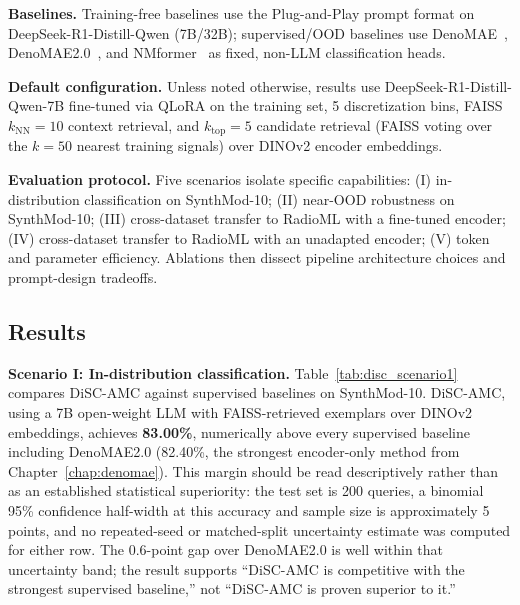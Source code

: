 \textbf{Baselines.} Training-free baselines use the Plug-and-Play prompt format on DeepSeek-R1-Distill-Qwen (7B/32B); supervised/OOD baselines use DenoMAE~\cite{faysal2025denomae}, DenoMAE2.0~\cite{faysal2025denomae20improvingdenoisingmasked}, and NMformer~\cite{faysal2024nmformer} as fixed, non-LLM classification heads.

\textbf{Default configuration.} Unless noted otherwise, results use DeepSeek-R1-Distill-Qwen-7B fine-tuned via QLoRA on the training set, 5 discretization bins, FAISS $k_{\mathrm{NN}}=10$ context retrieval, and $k_{\mathrm{top}}=5$ candidate retrieval (FAISS voting over the $k=50$ nearest training signals) over DINOv2 encoder embeddings.

\textbf{Evaluation protocol.} Five scenarios isolate specific capabilities: (I) in-distribution classification on SynthMod-10; (II) near-OOD robustness on SynthMod-10; (III) cross-dataset transfer to RadioML with a fine-tuned encoder; (IV) cross-dataset transfer to RadioML with an unadapted encoder; (V) token and parameter efficiency. Ablations then dissect pipeline architecture choices and prompt-design tradeoffs.

\subsection{Results}
\label{sec:disc_results}

\textbf{Scenario I: In-distribution classification.} Table~\ref{tab:disc_scenario1} compares DiSC-AMC against supervised baselines on SynthMod-10. DiSC-AMC, using a 7B open-weight LLM with FAISS-retrieved exemplars over DINOv2 embeddings, achieves \textbf{83.00\%}, numerically above every supervised baseline including DenoMAE2.0 (82.40\%, the strongest encoder-only method from Chapter~\ref{chap:denomae}). This margin should be read descriptively rather than as an established statistical superiority: the test set is 200 queries, a binomial 95\% confidence half-width at this accuracy and sample size is approximately 5 points, and no repeated-seed or matched-split uncertainty estimate was computed for either row. The 0.6-point gap over DenoMAE2.0 is well within that uncertainty band; the result supports ``DiSC-AMC is competitive with the strongest supervised baseline,'' not ``DiSC-AMC is proven superior to it.''

